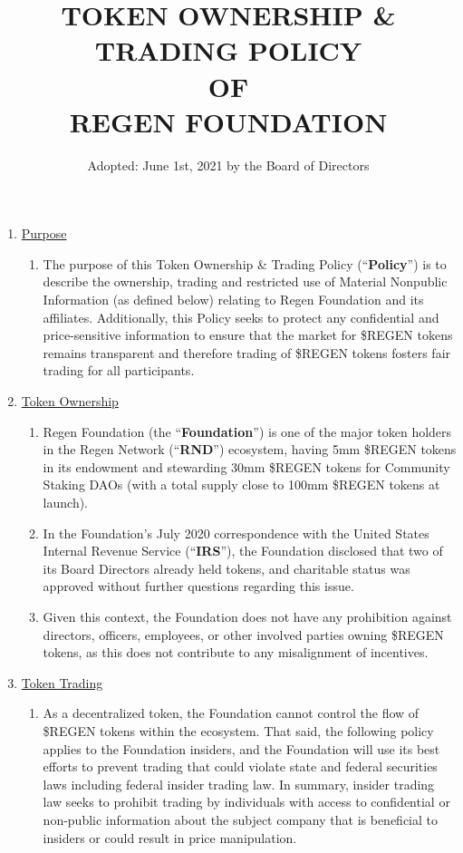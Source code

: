\documentclass[10pt]{article}
\begin{document}
\title{TOKEN OWNERSHIP \& TRADING POLICY \protect\\ OF \protect\\ REGEN FOUNDATION}
\author{Adopted: June 1st, 2021 by the Board of Directors}
\date{} 
\maketitle
\begin{enumerate}
\item \underline{Purpose}
  \begin{enumerate}
  \item The purpose of this Token Ownership \& Trading Policy (“{\bf Policy}”) is to describe the ownership, trading and restricted use of Material Nonpublic Information (as defined below) relating to Regen Foundation and its affiliates. Additionally, this Policy seeks to protect any confidential and price-sensitive information to ensure that the market for \$REGEN tokens remains transparent and therefore trading of \$REGEN tokens fosters fair trading for all participants.
  \end{enumerate}
\item \underline{Token Ownership}
  \begin{enumerate}
  \item Regen Foundation (the “{\bf Foundation}”) is one of the major token holders in the Regen Network (“{\bf RND}”) ecosystem, having 5mm \$REGEN tokens in its endowment and stewarding 30mm \$REGEN tokens for Community Staking DAOs (with a total supply close to 100mm \$REGEN tokens at launch).
  \item In the Foundation’s July 2020 correspondence with the United States Internal Revenue Service (“{\bf IRS}”), the Foundation disclosed that two of its Board Directors already held tokens, and charitable status was approved without further questions regarding this issue.
  \item Given this context, the Foundation does not have any prohibition against directors, officers, employees, or other involved parties owning \$REGEN tokens, as this does not contribute to any misalignment of incentives.
  \end{enumerate}
\item \underline{Token Trading}
  \begin{enumerate}
  \item As a decentralized token, the Foundation cannot control the flow of \$REGEN tokens within the ecosystem. That said, the following policy applies to the Foundation insiders, and the Foundation will use its best efforts to prevent trading that could violate state and federal securities laws including federal insider trading law. In summary, insider trading law seeks to prohibit trading by individuals with access to confidential or non-public information about the subject company that is beneficial to insiders or could result in price manipulation.

\end{enumerate}
\end{enumerate}
\end{document}
